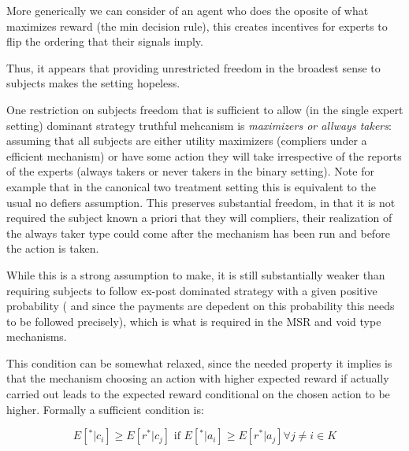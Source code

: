 \begin{eg}
	More generically we can consider of an agent who does the oposite of what maximizes reward (the min decision rule), this creates incentives for experts to flip the ordering that their signals imply. 
\end{eg}

Thus, it appears that providing unrestricted freedom in the broadest sense to subjects makes the setting hopeless. 

One restriction on subjects freedom that is sufficient to allow (in the single expert setting) dominant strategy truthful mehcanism is \emph{maximizers or allways takers}: assuming that all subjects are either utility maximizers (compliers under a efficient mechanism) or have some action they will take irrespective of the reports of the experts (always takers or never takers in the binary setting). Note for example that in the canonical two treatment setting this is equivalent to the usual no defiers assumption. 
This preserves substantial freedom, in that it is not required the subject known a priori that they will compliers, their realization of the always taker type could come after the mechanism has been run and before the action is taken. 

While this is a strong assumption to make, it is still substantially weaker than requiring subjects to follow ex-post dominated strategy with a given positive probability ( and since the payments are depedent on this probability this needs to be followed precisely), which is what is required in the MSR and void type mechanisms.

This condition can be somewhat relaxed,  since the needed property it implies is that the mechanism choosing an action with higher expected reward if actually carried out leads to the expected reward conditional on the chosen action to be higher. Formally a sufficient condition is:

\[
E[ ^{*}|c_i]  \geq E[ r^{*}|c_j] \text{ if }E[ ^{*}|a_i]  \geq E[ r^{*}|a_j]  \forall j \neq i \in K
\]





